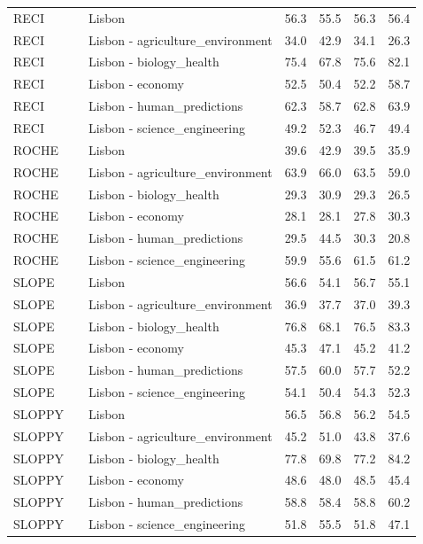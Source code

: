 \begin{tabular}{lllllll}
RECI &  & Lisbon & 56.3 & 55.5 & 56.3 & 56.4 \\
RECI &  & Lisbon - agriculture\_environment & 34.0 & 42.9 & 34.1 & 26.3 \\
RECI &  & Lisbon - biology\_health & 75.4 & 67.8 & 75.6 & 82.1 \\
RECI &  & Lisbon - economy & 52.5 & 50.4 & 52.2 & 58.7 \\
RECI &  & Lisbon - human\_predictions & 62.3 & 58.7 & 62.8 & 63.9 \\
RECI &  & Lisbon - science\_engineering & 49.2 & 52.3 & 46.7 & 49.4 \\
ROCHE &  & Lisbon & 39.6 & 42.9 & 39.5 & 35.9 \\
ROCHE &  & Lisbon - agriculture\_environment & 63.9 & 66.0 & 63.5 & 59.0 \\
ROCHE &  & Lisbon - biology\_health & 29.3 & 30.9 & 29.3 & 26.5 \\
ROCHE &  & Lisbon - economy & 28.1 & 28.1 & 27.8 & 30.3 \\
ROCHE &  & Lisbon - human\_predictions & 29.5 & 44.5 & 30.3 & 20.8 \\
ROCHE &  & Lisbon - science\_engineering & 59.9 & 55.6 & 61.5 & 61.2 \\
SLOPE &  & Lisbon & 56.6 & 54.1 & 56.7 & 55.1 \\
SLOPE &  & Lisbon - agriculture\_environment & 36.9 & 37.7 & 37.0 & 39.3 \\
SLOPE &  & Lisbon - biology\_health & 76.8 & 68.1 & 76.5 & 83.3 \\
SLOPE &  & Lisbon - economy & 45.3 & 47.1 & 45.2 & 41.2 \\
SLOPE &  & Lisbon - human\_predictions & 57.5 & 60.0 & 57.7 & 52.2 \\
SLOPE &  & Lisbon - science\_engineering & 54.1 & 50.4 & 54.3 & 52.3 \\
SLOPPY &  & Lisbon & 56.5 & 56.8 & 56.2 & 54.5 \\
SLOPPY &  & Lisbon - agriculture\_environment & 45.2 & 51.0 & 43.8 & 37.6 \\
SLOPPY &  & Lisbon - biology\_health & 77.8 & 69.8 & 77.2 & 84.2 \\
SLOPPY &  & Lisbon - economy & 48.6 & 48.0 & 48.5 & 45.4 \\
SLOPPY &  & Lisbon - human\_predictions & 58.8 & 58.4 & 58.8 & 60.2 \\
SLOPPY &  & Lisbon - science\_engineering & 51.8 & 55.5 & 51.8 & 47.1 \\
\bottomrule
\end{tabular}
